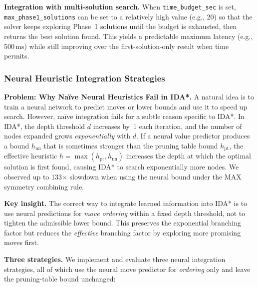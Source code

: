 \documentclass[10pt,twocolumn,a4paper]{article}
\begin{document}
\textbf{Integration with multi-solution search.} When \texttt{time\_budget\_sec} is set, \texttt{max\_phase1\_solutions} can be set to a relatively high value (e.g., 20) so that the solver keeps exploring Phase~1 solutions until the budget is exhausted, then returns the best solution found. This yields a predictable maximum latency (e.g., 500\,ms) while still improving over the first-solution-only result when time permits.

\subsubsection{Neural Heuristic Integration Strategies}
\label{sec:neural-strategies}

\textbf{Problem: Why Na\"ive Neural Heuristics Fail in IDA*.}
A natural idea is to train a neural network to predict moves or lower bounds and use it to speed up search. However, na\"ive integration fails for a subtle reason specific to IDA*. In IDA*, the depth threshold $d$ increases by~1 each iteration, and the number of nodes expanded grows \emph{exponentially} with $d$. If a neural value predictor produces a bound $h_{\mathrm{nn}}$ that is sometimes stronger than the pruning table bound $h_{\mathrm{pt}}$, the effective heuristic $h = \max(h_{\mathrm{pt}}, h_{\mathrm{nn}})$ increases the depth at which the optimal solution is first found, causing IDA* to search exponentially more nodes. We observed up to 133$\times$ slowdown when using the neural bound under the MAX symmetry combining rule.

\textbf{Key insight.} The correct way to integrate learned information into IDA* is to use neural predictions for \emph{move ordering} within a fixed depth threshold, not to tighten the admissible lower bound. This preserves the exponential branching factor but reduces the \emph{effective} branching factor by exploring more promising moves first.

\textbf{Three strategies.} We implement and evaluate three neural integration strategies, all of which use the neural move predictor for \emph{ordering} only and leave the pruning-table bound unchanged:
\end{document}
